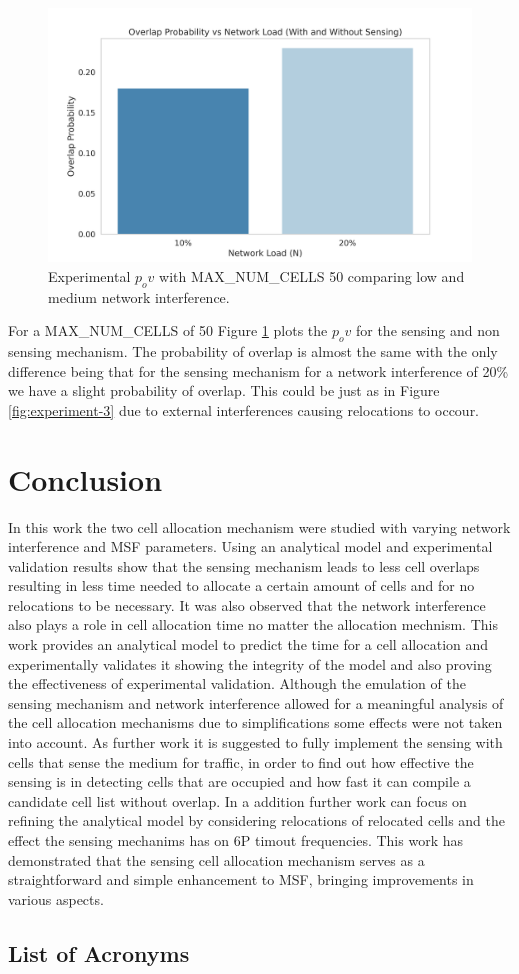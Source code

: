 \documentclass{comnets-thesis}
\begin{document}
\begin{figure}[H]
    \centering
    \includegraphics[width=1\textwidth]{./images/experiment_N50_pov.png}
    \caption{Experimental $p_ov$ with MAX\_NUM\_CELLS 50 comparing low and medium network interference.}
    \label{fig:pov-graph-n-50}
\end{figure}

For a MAX\_NUM\_CELLS of 50 Figure \ref{fig:pov-graph-n-50} plots the $p_ov$ for the sensing and non sensing mechanism. The probability of overlap is almost the same with the only difference being that for the sensing mechanism for a network interference of 20\% we have a slight probability of overlap. This could be just as in Figure \ref{fig:experiment-3} due to external interferences causing relocations to occour.


\chapter{Conclusion}\label{chp:conclusion}
In this work the two cell allocation mechanism were studied with varying network interference and \ac{MSF} parameters. Using an analytical model and experimental validation results show that the sensing mechanism leads to less cell overlaps resulting in less time needed to allocate a certain amount of cells and for no relocations to be necessary. It was also observed that the network interference also plays a role in cell allocation time no matter the allocation mechnism.
This work provides an analytical model to predict the time for a cell allocation and experimentally validates it showing the integrity of the model and also proving the effectiveness of experimental validation.
Although the emulation of the sensing mechanism and network interference allowed for a meaningful analysis of the cell allocation mechanisms due to simplifications some effects were not taken into account. As further work it is suggested to fully implement the sensing with cells that sense the medium for traffic, in order to find out how effective the sensing is in detecting cells that are occupied and how fast it can compile a candidate cell list without overlap. In a addition further work can focus on refining the analytical model by considering relocations of relocated cells and the effect the sensing mechanims has on \ac{6P} timout frequencies.
This work has demonstrated that the sensing cell allocation mechanism serves as a straightforward and simple enhancement to \ac{MSF}, bringing improvements in various aspects.


\listoffigures
\listoftables
\printbibliography[heading=bibintoc]

\section*{List of Acronyms}

\end{document}

